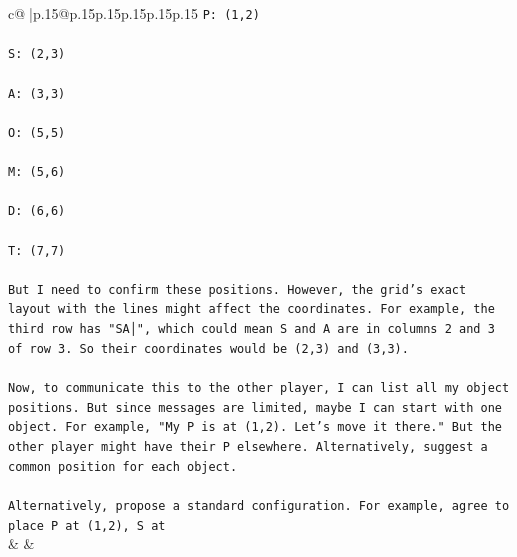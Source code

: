 \documentclass{article}
\begin{document}
{\begin{supertabular}{c@{$\;$}|p{.15\linewidth}@{}p{.15\linewidth}p{.15\linewidth}p{.15\linewidth}p{.15\linewidth}p{.15\linewidth}}
{{{\texttt{P: (1,2)} \\
\\ 
\texttt{S: (2,3)} \\
\\ 
\texttt{A: (3,3)} \\
\\ 
\texttt{O: (5,5)} \\
\\ 
\texttt{M: (5,6)} \\
\\ 
\texttt{D: (6,6)} \\
\\ 
\texttt{T: (7,7)} \\
\\ 
\texttt{But I need to confirm these positions. However, the grid's exact layout with the lines might affect the coordinates. For example, the third row has "SA│", which could mean S and A are in columns 2 and 3 of row 3. So their coordinates would be (2,3) and (3,3). } \\
\\ 
\texttt{Now, to communicate this to the other player, I can list all my object positions. But since messages are limited, maybe I can start with one object. For example, "My P is at (1,2). Let's move it there." But the other player might have their P elsewhere. Alternatively, suggest a common position for each object. } \\
\\ 
\texttt{Alternatively, propose a standard configuration. For example, agree to place P at (1,2), S at} \\
            }
        }
    }
    & & \\ \\


\end{supertabular}}
\end{document}
